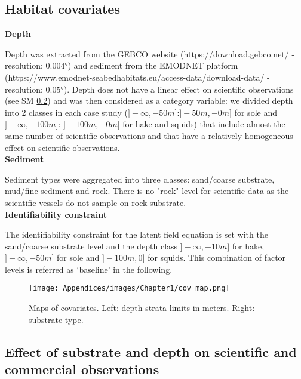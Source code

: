 \clearpage

\subsection{Habitat covariates}\label{appendix:HabCov}

\textbf{Depth}

Depth was extracted from the GEBCO website (https://download.gebco.net/ - resolution: 0.004°) and sediment from the EMODNET platform (https://www.emodnet-seabedhabitats.eu/access-data/download-data/ - resolution: 0.05°). Depth does not have a linear effect on scientific observations (see SM \ref{appendix:EffCov}) and was then considered as a category variable: we divided depth into 2 classes in each case study (\(]-\infty,-50m]\):\(]-50m,-0m]\) for sole and \(]-\infty,-100m]\): \(]-100m,-0m]\) for hake and squids) that include almost the same number of scientific observations and that have a relatively homogeneous effect on scientific observations. \\

\textbf{Sediment}

Sediment types were aggregated into three classes: sand/coarse substrate, mud/fine sediment and rock. There is no "rock" level for scientific data as the scientific vessels do not sample on rock substrate.  \\

\textbf{Identifiability constraint}

The identifiability constraint for the latent field equation is set with the sand/coarse substrate level and the depth class $]-\infty,-10m]$ for hake, $]-\infty,-50m]$ for sole and $]-100m, 0]$ for squids. This combination of factor levels is referred as ‘baseline’ in the following.

\newpage

\begin{figure}[H]
   \begin{center}
      \texttt{[image: Appendices/images/Chapter1/cov\_map.png]}
   \end{center}
   \caption[Maps of covariates.]
   {Maps of covariates. Left: depth strata limits in meters. Right: substrate type.}
   \label{fig:MapCov}
\end{figure}


\subsection{Effect of substrate and depth on scientific and commercial observations}\label{appendix:EffCov}

